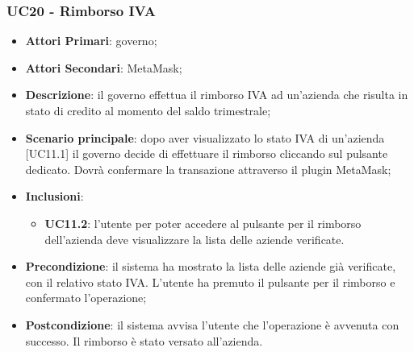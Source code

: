 \subsubsection{UC20 - Rimborso IVA}
\begin{itemize}
	\item \textbf{Attori Primari}:
	governo;
	\item \textbf{Attori Secondari}:
	MetaMask\glo;
	\item \textbf{Descrizione}: il governo effettua il rimborso IVA ad un'azienda che risulta in stato di credito al momento del saldo trimestrale;
	\item \textbf{Scenario principale}: dopo aver visualizzato lo stato IVA di un'azienda [UC11.1] il governo decide di effettuare il rimborso cliccando sul pulsante dedicato. Dovrà confermare la transazione attraverso il plugin MetaMask\glo;
	\item \textbf{Inclusioni}: 
	\begin{itemize}
		\item \textbf{UC11.2}: l'utente per poter accedere al pulsante per il rimborso dell'azienda deve visualizzare la lista delle aziende verificate.
	\end{itemize}
	\item \textbf{Precondizione}: il sistema ha mostrato la lista delle aziende già verificate, con il relativo stato IVA. L'utente ha premuto il pulsante per il rimborso e confermato l'operazione;
	\item \textbf{Postcondizione}: il sistema avvisa l'utente che l'operazione è avvenuta con successo. Il rimborso è stato versato all'azienda.
\end{itemize} 

